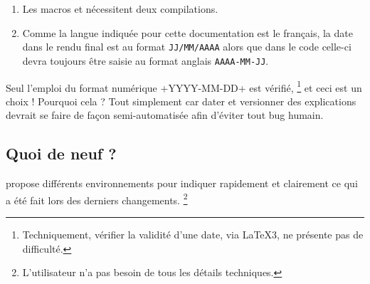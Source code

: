 \begin{tdocimp}
    \leavevmode

    \begin{enumerate}
        \item Les macros  et  nécessitent deux compilations.

        \item Comme la langue indiquée pour cette documentation est le français, la date dans le rendu final est au format \texttt{JJ/MM/AAAA} alors que dans le code celle-ci devra toujours être saisie au format anglais \texttt{AAAA-MM-JJ}.
    \end{enumerate}
\end{tdocimp}


\begin{tdocwarn}
    Seul l'emploi du format numérique \tdocinlatex+YYYY-MM-DD+ est vérifié,
    \footnote{
        Techniquement, vérifier la validité d'une date, via \LaTeX3, ne présente pas de difficulté.
    }
    et ceci est un choix ! Pourquoi cela ? Tout simplement car dater et versionner des explications devrait se faire de façon semi-automatisée afin d'éviter tout bug humain.
\end{tdocwarn}


\subsection{Quoi de neuf ?} 

\thispack{} propose différents environnements pour indiquer rapidement et clairement ce qui a été fait lors des derniers changements.%
\footnote{
    L'utilisateur n'a pas besoin de tous les détails techniques.
}


\begin{tdocexa}
    \leavevmode


\end{tdocexa}




\begin{tdocexa}
    \leavevmode


\end{tdocexa}


